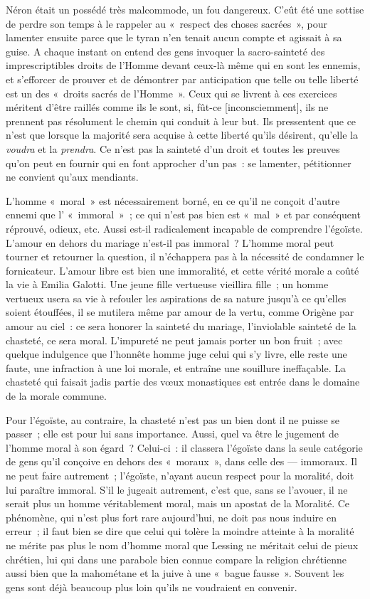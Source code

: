 \documentclass[french,twoside]{book} %
\newcommand\corr[1]{#1}
\begin{document}
Néron était un possédé très malcommode, un fou dangereux. C’eût été une sottise de perdre son temps à le rappeler au « respect des choses sacrées », pour lamenter ensuite parce que le tyran n’en tenait aucun compte et agissait à sa guise. A chaque instant on entend des gens invoquer la sacro-sainteté des imprescriptibles droits de l’Homme devant ceux-là même qui en sont les ennemis, et s’efforcer de prouver et de démontrer par anticipation que telle ou telle liberté est un des « droits sacrés de l’Homme ». Ceux qui se livrent à ces exercices méritent d’être raillés comme ils le sont, si, fût-ce [{\corr inconsciemment}], ils ne prennent pas résolument le chemin qui conduit à leur but. Ils pressentent que ce n’est que lorsque la majorité sera acquise à cette liberté qu’ils désirent, qu’elle la \emph{voudra} et la \emph{prendra}. Ce n’est pas la sainteté d’un droit et toutes les preuves qu’on peut en fournir qui en font approcher d’un pas : se lamenter, pétitionner ne convient qu’aux mendiants.\par
L’homme « moral » est nécessairement borné, en ce qu’il ne conçoit d’autre ennemi que l’ « immoral » ; ce qui n’est pas bien est « mal » et par conséquent réprouvé, odieux, etc. Aussi est-il radicalement incapable de comprendre l’égoïste. L’amour en dehors du mariage n’est-il pas immoral ? L’homme moral peut tourner et retourner la question, il n’échappera pas à la nécessité de condamner le fornicateur. L’amour libre est bien une immoralité, et cette vérité morale a coûté la vie à Emilia Galotti. Une jeune fille vertueuse vieillira fille ; un homme vertueux usera sa vie à refouler les aspirations de sa nature jusqu’à ce qu’elles soient étouffées, il se mutilera même par amour de la vertu, comme Origène par amour au ciel : ce sera honorer la sainteté du mariage, l’inviolable sainteté de la chasteté, ce sera  moral. L’impureté ne peut jamais porter un bon fruit ; avec quelque indulgence que l’honnête homme juge celui qui s’y livre, elle reste une faute, une infraction à une loi morale, et entraîne une souillure ineffaçable. La chasteté qui faisait jadis partie des vœux monastiques est entrée dans le domaine de la morale commune.\par
Pour l’égoïste, au contraire, la chasteté n’est pas un bien dont il ne puisse se passer ; elle est pour lui sans importance. Aussi, quel va être le jugement de l’homme moral à son égard ? Celui-ci : il classera l’égoïste dans la seule catégorie de gens qu’il conçoive en dehors des « moraux », dans celle des — immoraux. Il ne peut faire autrement ; l’égoïste, n’ayant aucun respect pour la moralité, doit lui paraître immoral. S’il le jugeait autrement, c’est que, sans se l’avouer, il ne serait plus un homme véritablement moral, mais un apostat de la Moralité. Ce phénomène, qui n’est plus fort rare aujourd’hui, ne doit pas nous induire en erreur ; il faut bien se dire que celui qui tolère la moindre atteinte à la moralité ne mérite pas plus le nom d’homme moral que Lessing ne méritait celui de pieux chrétien, lui qui dans une parabole bien connue compare la religion chrétienne aussi bien que la mahométane et la juive à une « bague fausse ». Souvent les gens sont déjà beaucoup plus loin qu’ils ne voudraient en convenir.\par
\end{document}

